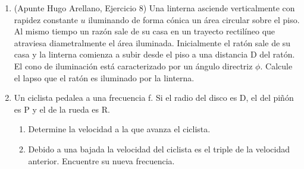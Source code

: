 \documentclass[letterpaper,11pt]{article}
\begin{document}
\begin{enumerate}
\item (Apunte Hugo Arellano, Ejercicio 8) Una linterna asciende verticalmente con rapidez constante $u$ iluminando de forma cónica un área circular sobre el piso. Al mismo tiempo un razón sale de su casa en un trayecto rectilíneo que atraviesa diametralmente el área iluminada. Inicialmente el ratón sale de su casa y la linterna comienza a subir desde el piso a una distancia D del ratón. El cono de iluminación está caracterizado por un 
ángulo directriz $\phi$. Calcule el lapso que el ratón es iluminado por la linterna.

\item Un ciclista pedalea a una frecuencia f. Si el radio del disco es D, el del piñón es P y el de la rueda es R.
 \begin{enumerate}
     \item Determine la velocidad a la que avanza el ciclista.
     \item Debido a una bajada la velocidad del ciclista es el triple de la velocidad anterior. Encuentre su nueva frecuencia.
 \end{enumerate}
\end{enumerate}
\end{document}
